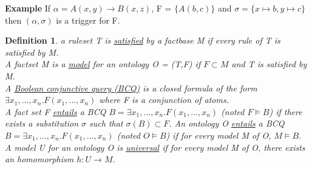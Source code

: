 \documentclass{article}
\newtheorem{defi}{Definition}
\begin{document}
\noindent \textbf{Example} If $\alpha = A(x,y) \rightarrow B(x,z)$, F = $\{A(b,c)\}$ and $\sigma = \{x \mapsto b, y \mapsto c \}$ then $(\alpha,\sigma)$ is a trigger for F.

\begin{defi}
a ruleset T is \underline{satisfied} by a factbase M if every rule of T is satisfied by M. \\
A factset M is a \underline{model} for an ontology O = (T,F) if $F \subset M$ and T is satisfied by M. \\
A \underline{Boolean conjunctive query (BCQ)} is a closed formula of the form \\ $\exists x_1,...,x_n. F(x_1,...,x_n)$ where F is a conjunction of atoms. \\
A fact set F \underline{entails} a BCQ $B = \exists x_1,...,x_n.F(x_1,...,x_n)$ (noted $F \vDash B$) if there exists a substitution $\sigma$ such that $\sigma(B) \subset F$. An ontology O \underline{entails} a BCQ $B = \exists x_1,...,x_n.F(x_1,...,x_n)$ (noted $O \vDash B$) if for every model M of O, $M \vDash B$.\\
A model U for an ontology O is \underline{universal} if for
every model M of O, there exists an homomorphism $h : U \to M$.
\end{defi}
\end{document}
